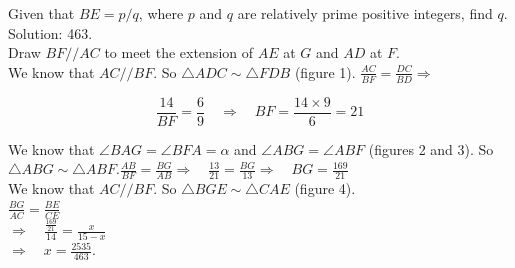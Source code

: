 \documentclass[10pt]{article}
\begin{document}
Given that \(B E=p / q\), where \(p\) and \(q\) are relatively prime positive integers, find \(q\).\\
Solution: 463.\\
Draw \(B F / / A C\) to meet the extension of \(A E\) at \(G\) and \(A D\) at \(F\).\\
We know that \(A C / / B F\). So \(\triangle A D C \sim \triangle F D B\) (figure 1). \(\frac{A C}{B F}=\frac{D C}{B D} \Rightarrow\)

\[
\frac{14}{B F}=\frac{6}{9} \quad \Rightarrow \quad B F=\frac{14 \times 9}{6}=21
\]

We know that \(\angle B A G=\angle B F A=\alpha\) and \(\angle A B G=\angle A B F\) (figures 2 and 3). So \(\triangle A B G \sim \triangle A B F . \frac{A B}{B F}=\frac{B G}{A B} \Rightarrow \quad \frac{13}{21}=\frac{B G}{13} \Rightarrow \quad B G=\frac{169}{21}\)\\
We know that \(A C / / B F\). So \(\triangle B G E \sim \triangle C A E\) (figure 4).\\
\(\frac{B G}{A C}=\frac{B E}{C E}\)\\
\(\Rightarrow \quad \frac{\frac{169}{21}}{14}=\frac{x}{15-x}\)\\
\(\Rightarrow \quad x=\frac{2535}{463}\).
\end{document}
